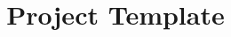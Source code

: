\documentclass[12pt]{amsart}
\title{\AmSTeX Project Template}
\begin{document}

  
  \maketitle
  \tableofcontents
  \mbox{}
  
  \printnomenclature

\end{document}

